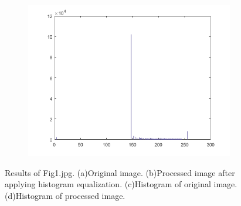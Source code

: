 \begin{figure}[h!]
\begin{subfigure}[b]{0.45\linewidth}
    	\caption{}
    	\label{fig:fbar1}
  	\end{subfigure}
	\begin{subfigure}[b]{0.45\linewidth}
    	\includegraphics[width=\linewidth]{myfigure/p1/gbar1.png}
    	\caption{}
    	\label{fig:gbar1}
  	\end{subfigure}
  	\caption{Results of Fig1.jpg. (a)Original image. (b)Processed image after applying histogram equalization. (c)Histogram of original image. (d)Histogram of processed image.}
  	\label{fig:result1}
\end{figure}


